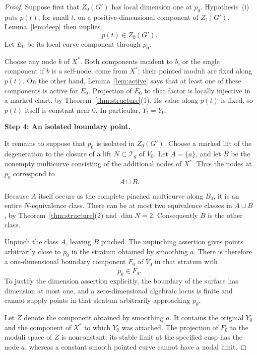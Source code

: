 \documentclass[11pt]{article}
\newcommand{\T}{\mathcal T}
\newcommand{\ol}[1]{\overline{#1}}
\theoremstyle{remark}
\begin{document}
\begin{proof}
Suppose first that \(Z_0(G')\) has local dimension one at
\(p_0\). Hypothesis~(i) puts \(p(t)\), for small \(t\), on a
positive-dimensional component of \(Z_t(G')\).
Lemma~\ref{lem:deep} then implies
\[
p(t)\in Z_0(G').
\]
Let \(E_0\) be its local curve component through \(p_0\).

Choose any node \(b\) of \(X^\ast\). Both components incident
to \(b\), or the single component if \(b\) is a self-node,
come from \(X^\ast\); their pointed moduli are fixed along
\(p(t)\). On the other hand, Lemma~\ref{lem:active} says that
at least one of these components is active for \(E_0\).
Projection of \(E_0\) to that factor is locally injective in
a marked chart, by Theorem~\ref{thm:structure}(1).
Its value along \(p(t)\) is fixed, so \(p(t)\) itself is
constant near \(0\). In particular, \(Y_t=Y_0\).

\medskip
\noindent\textbf{Step 4: An isolated boundary point.}

It remains to suppose that \(p_0\) is isolated in \(Z_0(G')\).
Choose a marked lift of the degeneration to the closure of
a lift \(N\subset\T_g\) of \(V_0\).
Let \(A=\{a\}\), and let \(B\) be the nonempty multicurve
consisting of the additional nodes of \(X^\ast\).
Thus the nodes at \(p_0\) correspond to
\[
A\sqcup B.
\]

Because \(A\) itself occurs as the complete pinched multicurve
along \(B_0\), it is an entire \(N\)-equivalence class.
There can be at most two equivalence classes in \(A\sqcup B\),
by Theorem~\ref{thm:structure}(2) and \(\dim N=2\).
Consequently \(B\) is the other class.

Unpinch the class \(A\), leaving \(B\) pinched.
The unpinching assertion gives points arbitrarily close to
\(p_0\) in the stratum obtained by smoothing \(a\).
There is therefore a one-dimensional boundary component
\(F_0\) of \(V_0\) in that stratum with
\[
p_0\in\ol{F_0}.
\]
To justify the dimension assertion explicitly, the boundary of
the surface has dimension at most one, and a zero-dimensional
algebraic locus is finite and cannot supply points in that
stratum arbitrarily approaching \(p_0\).


Let \(Z\) denote the component obtained by smoothing \(a\).
It contains the original \(Y_0\) and the component of
\(X^\ast\) to which \(Y_0\) was attached.
The projection of \(F_0\) to the moduli space of \(Z\) is
nonconstant: its stable limit at the specified cusp has
the node \(a\), whereas a constant smooth pointed curve
cannot have a nodal limit.


\end{proof}
\end{document}
